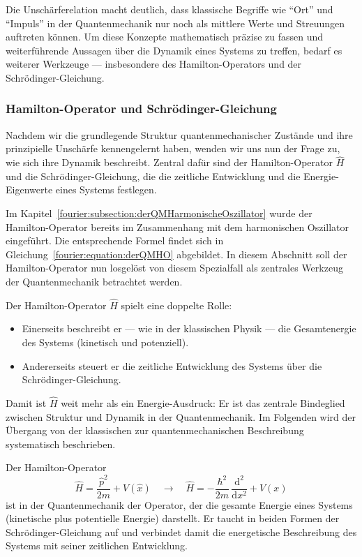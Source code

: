	Die Unschärferelation macht deutlich, dass klassische Begriffe wie ``Ort'' und ``Impuls'' in der Quantenmechanik nur noch als mittlere Werte und Streuungen auftreten können.
	Um diese Konzepte mathematisch präzise zu fassen und weiterführende Aussagen über die Dynamik eines Systems zu treffen, bedarf es weiterer Werkzeuge ---
	insbesondere des Hamilton-Operators und der Schrödinger-Gleichung.

	\subsubsection{Hamilton-Operator und Schrödinger-Gleichung%
	\label{fourier:subsubsection:hamiltonOperatorUndSchroedinger}} 
		Nachdem wir die grundlegende Struktur quantenmechanischer Zustände und ihre prinzipielle Unschärfe kennengelernt haben, wenden wir uns nun der Frage zu, wie sich ihre Dynamik beschreibt.
		Zentral dafür sind der Hamilton-Operator \( \hat{H} \) und die Schrödinger-Gleichung, die die zeitliche Entwicklung und die Energie-Eigenwerte eines Systems festlegen.

		Im Kapitel~\ref{fourier:subsection:derQMHarmonischeOszillator} wurde der Hamilton-Operator bereits im Zusammenhang mit dem harmonischen Oszillator eingeführt.
		Die entsprechende Formel findet sich in Gleichung~\ref{fourier:equation:derQMHO} abgebildet.
		In diesem Abschnitt soll der Hamilton-Operator nun losgelöst von diesem Spezialfall als zentrales Werkzeug der Quantenmechanik betrachtet werden.
		
		Der Hamilton-Operator \( \hat{H} \) spielt eine doppelte Rolle:
		\begin{itemize}
		\item Einerseits beschreibt er — wie in der klassischen Physik — die Gesamtenergie des Systems (kinetisch und potenziell).
		\item Andererseits steuert er die zeitliche Entwicklung des Systems über die Schrödinger-Gleichung.
		\end{itemize}

		Damit ist \( \hat{H} \) weit mehr als ein Energie-Ausdruck: Er ist das zentrale Bindeglied zwischen Struktur und Dynamik in der Quantenmechanik. Im Folgenden wird der Übergang von der klassischen zur quantenmechanischen Beschreibung systematisch beschrieben.



	Der Hamilton-Operator
	\begin{equation}\label{fourier:equation:hamiltonOperator}
		\hat{H} = \frac{\hat p^2}{2m} + V(\hat{x})
		\quad\longrightarrow\quad
		\hat{H} = -\frac{\hbar^2}{2m}\,\frac{\mathrm{d}^2}{\mathrm{d}x^2} + V(x)
	\end{equation}
	ist in der Quantenmechanik der Operator, der die gesamte Energie eines Systems (kinetische plus potentielle Energie) darstellt.
	Er taucht in beiden Formen der Schrödinger-Gleichung auf und verbindet damit die energetische Beschreibung des Systems mit seiner zeitlichen Entwicklung.

